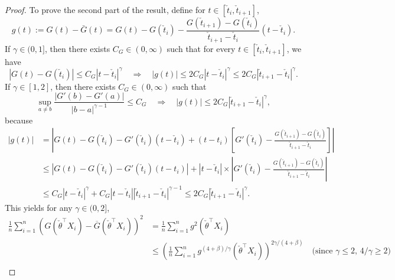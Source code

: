 {\begin{proof}
To prove the second part of the result, define for $t\in[\check{t}_i, \check{t}_{i+1}]$,
\[
g(t) := G(t) - \bar{G}(t) = G(t) - G(\check{t}_i) - \frac{G(\check{t}_{i+1}) - G(\check{t}_i)}{\check{t}_{i+1} - \check{t}_i}(t - \check{t}_i).
\]
If $\gamma\in(0, 1]$, then there exists $C_G\in(0, \infty)$ such that for every $t\in [ \check{t}_i, \check{t}_{i+1}]$, we have 
\begin{equation}\label{eq:gamma_Holder}
|G(t) - G(\check{t}_i)| \le C_G|t - \check{t}_i|^{\gamma}\quad\Rightarrow\quad |g(t)| \le 2C_G|{t} - \check{t}_{i}|^{\gamma} \le 2C_G|\check{t}_{i+1} - \check{t}_{i}|^{\gamma}.
\end{equation}
If $\gamma\in[1, 2]$, then there exists $C_G\in(0, \infty)$ such that
\begin{equation}\label{eq:1plusgamma_Holder}
\sup_{a\neq b}\frac{|G'(b) - G'(a)|}{|b - a|^{\gamma-1}} \le C_G\quad\Rightarrow\quad |g(t)| \le 2C_G|\check{t}_{i+1} - \check{t}_i|^{\gamma},
\end{equation}
because
\begin{align*}
|g(t)| &= \left|G(t) - G(\check{t}_i) - G'(\check{t}_i)(t - \check{t}_i) + (t - t_i)\left[G'(\check{t}_i) - \frac{G(\check{t}_{i+1}) - G(\check{t}_i)}{\check{t}_{i+1} - \check{t}_i}\right]\right|\\
&\le \left|G(t) - G(\check{t}_i) - G'(\check{t}_i)(t - t_i)\right| + |t - \check{t}_i|\times\left|G'(\check{t}_i) - \frac{G(\check{t}_{i+1}) - G(\check{t}_i)}{\check{t}_{i+1} - \check{t}_i}\right|\\
&\le C_G|t - \check{t}_i|^{\gamma} + C_G|t - \check{t}_i||\check{t}_{i+1} - \check{t}_i|^{\gamma - 1} \le 2C_G|\check{t}_{i+1} - \check{t}_i|^{\gamma}.
\end{align*}
This yields for any $\gamma\in(0, 2]$,
{ \begin{align}
\frac{1}{n}\sum_{i=1}^n \left(G(\check{\theta}^{\top}X_i) - \overline{G}(\check{\theta}^{\top}X_i)\right)^2 &= \frac{1}{n}\sum_{i=1}^n g^2(\check{\theta}^{\top}X_i)\nonumber\\
&\le \left(\frac{1}{n}\sum_{i=1}^n g^{(4+\beta)/\gamma}(\check{\theta}^{\top}X_i)\right)^{2\gamma/(4 + \beta)}\quad\mbox{(since $\gamma \le 2$, $4/\gamma \ge 2$)}\nonumber\\

\end{align}}
\end{proof}}
